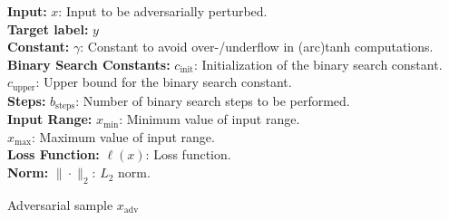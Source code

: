 \textbf{Input:} $x$: Input to be adversarially perturbed. \\
\textbf{Target label:} $y$ \\
\textbf{Constant:} $\gamma$: Constant to avoid over-/underflow in (arc)tanh computations. \\
\textbf{Binary Search Constants:} $c_{\text{init}}$: Initialization of the binary search constant. \\
$c_{\text{upper}}$: Upper bound for the binary search constant. \\
\textbf{Steps:} $b_{\text{steps}}$: Number of binary search steps to be performed. \\
\textbf{Input Range:} $x_{\text{min}}$: Minimum value of input range. \\
$x_{\text{max}}$: Maximum value of input range. \\
\textbf{Loss Function:} $\ell(x)$: Loss function. \\
\textbf{Norm:} $\| \cdot \|_2$: $L_2$ norm.

Adversarial sample $x_{\text{adv}}$

